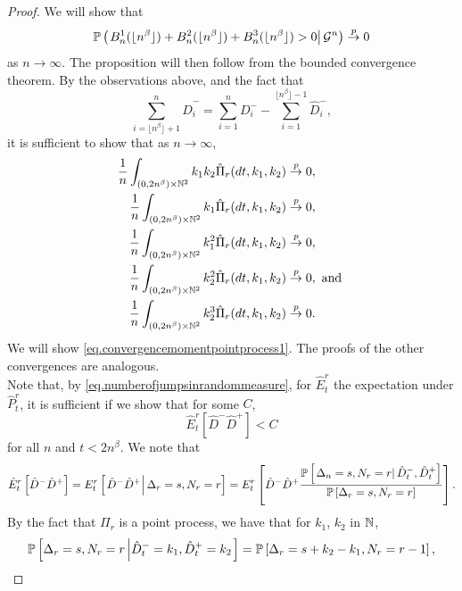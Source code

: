 \begin{proof}
We will show that \begin{equation}\label{eq.conditionalprobanamolousedges}\P\left(\left.B^1_n(\lfloor n^\beta \rfloor)+B^2_n(\lfloor n^\beta \rfloor)+B^3_n(\lfloor n^\beta \rfloor)>0\right| \cG^n \right)\overset{p}{\to}0\end{equation} as $n\to\infty$. The proposition will then follow from the bounded convergence theorem. By the observations above, and the fact that $$\sum_{i=\lfloor n^\beta \rfloor+1}^n \hat{D}^-_i=\sum_{i=1}^n D^-_i-\sum_{i=1}^{\lfloor n^\beta \rfloor -1}\hat{D}^-_i,$$ it is sufficient to show that as $n\to \infty$,
\begin{align}
\frac{1}{n}\int_{(0,2n^\beta)\times \N^2}k_1k_2 \hat{\Pi}_r(dt,k_1,k_2)&\overset{p}{\to}0,\label{eq.convergencemomentpointprocess1}\\
\frac{1}{n}\int_{(0,2n^\beta)\times \N^2}k_1 \hat{\Pi}_r(dt,k_1,k_2)&\overset{p}{\to}0,\label{eq.convergencemomentpointprocess2}\\
\frac{1}{n}\int_{(0,2n^\beta)\times \N^2}k_1^2 \hat{\Pi}_r(dt,k_1,k_2)&\overset{p}{\to}0,\label{eq.convergencemomentpointprocess3}\\
\frac{1}{n}\int_{(0,2n^\beta)\times \N^2}k_2^2 \hat{\Pi}_r(dt,k_1,k_2)&\overset{p}{\to}0,\text{ and }\label{eq.convergencemomentpointprocess4}\\
\frac{1}{n}\int_{(0,2n^\beta)\times \N^2}k_2^3 \hat{\Pi}_r(dt,k_1,k_2)&\overset{p}{\to}0.\label{eq.convergencemomentpointprocess5}\end{align}
We will show \ref{eq.convergencemomentpointprocess1}. The proofs of the other convergences are analogous. \\
Note that, by \eqref{eq.numberofjumpsinrandommeasure}, for $\hat{E}^r_t$ the expectation under $\hat{P}^r_t$, it is sufficient if we show that for some $C$,
\begin{equation}\label{eq.expectationtobound}{\hat{E}}^r_t\left[\hat{D}^-\hat{D}^+\right]
<C\end{equation}
for all $n$ and $t<2n^\beta$. We note that
$${\hat{E}}^r_t\left[\hat{D}^-\hat{D}^+\right]={E}^r_t\left[\left.\hat{D}^-\hat{D}^+\right| \Delta_r=s, N_r=r\right]={E}^r_t\left[\hat{D}^-\hat{D}^+\frac{\P\left[\left. \Delta_n=s, N_r=r \right| \hat{D}^-_t,\hat{D}^+_t\right]}{\P\left[ \Delta_r=s, N_r=r\right]}\right].$$
By the fact that $\Pi_r$ is a point process, we have that for $k_1$, $k_2$ in $\N$, 
$$\P\left[ \Delta_r=s, N_r=r \left| \hat{D}^-_t=k_1,\hat{D}^+_t=k_2\right.\right]=\P\left[ \Delta_r=s+k_2-k_1, N_r=r-1 \right],$$

\end{proof}
